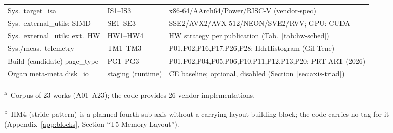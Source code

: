 \begin{nurlang}
\begin{table}[!htbp]
\begin{tabular}{@{}l l p{6.8cm}@{}}
    \midrule
    Sys.\ target\_isa & IS1--IS3 & x86-64/AArch64/Power/RISC-V (vendor-spec) \\
    Sys.\ external\_utils: SIMD & SE1--SE3 & SSE2/AVX2/AVX-512/NEON/SVE2/RVV\@; GPU\@: CUDA \\
    Sys.\ external\_utils: ext.\ HW & HW1--HW4 & HW strategy per publication (Tab.~\ref{tab:hw-sched}) \\
    Sys./meas.\ telemetry & TM1--TM3 & P01,P02,P16,P17,P26,P28; HdrHistogram (Gil Tene) \\
    Build (candidate) page\_type & PG1--PG3 & P01,P02,P04,P05,P06,P10,P11,P12,P13,P20; PRT-ART (2026) \\
    Organ meta-meta disk\_io & staging (runtime) & CE baseline; optional, disabled (Section~\ref{sec:axis-triad}) \\
    \bottomrule
  \end{tabular}

  \smallskip
  {\footnotesize \textsuperscript{a}~Corpus of 23 works (A01--A23); the code provides 26 vendor implementations.\par}
  {\footnotesize \textsuperscript{b}~HM4 (stride pattern) is a planned fourth sub-axis without a carrying layout building block; the code carries no tag for it (Appendix~\ref{app:blocks}, Section \enquote{T5 Memory Layout}).\par}
\end{table}
\end{nurlang}
